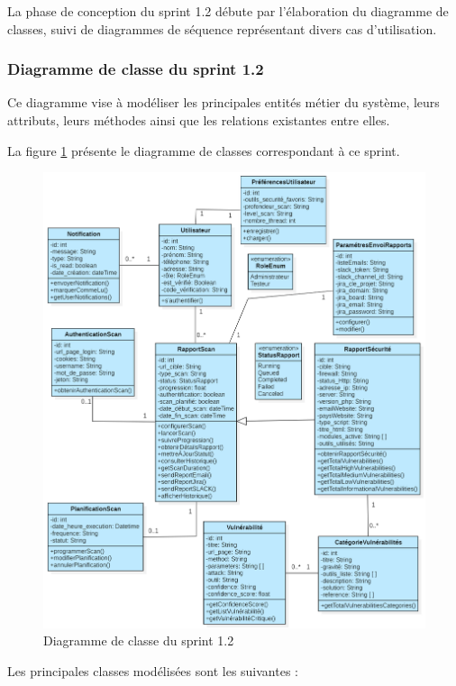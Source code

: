 La phase de conception du sprint 1.2 débute par l’élaboration du diagramme de classes, suivi de diagrammes de séquence représentant divers cas d'utilisation. 

\subsubsection{Diagramme de classe du sprint 1.2}
Ce diagramme vise à modéliser les principales entités métier du système, leurs attributs, leurs méthodes ainsi que les relations existantes entre elles.

La figure \ref{fig:classsp1} présente le diagramme de classes correspondant à ce sprint.
\begin{figure}[H]
    \centering
    \includegraphics[width=0.9\linewidth]{chapitres/ch3Sp1/section/sprint2/img/classeL1-SP1.2.png}
    \caption{Diagramme de classe du sprint 1.2}
    \label{fig:classsp1}
\end{figure}
\vspace{-0.6cm}
Les principales classes modélisées sont les suivantes :
